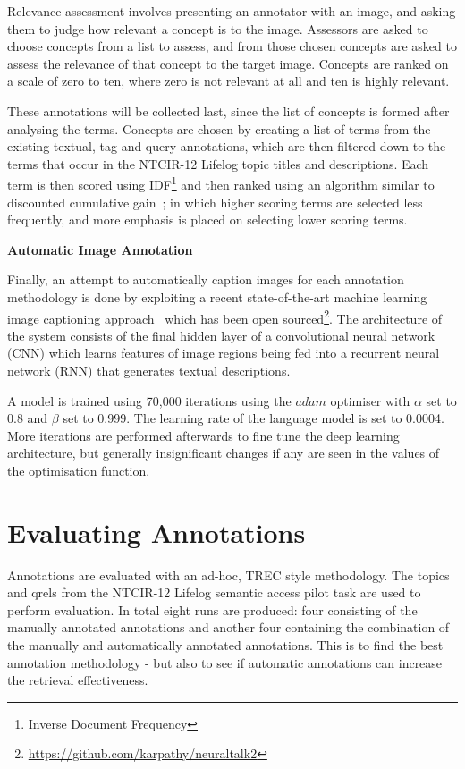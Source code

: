 Relevance assessment involves presenting an annotator with an image, and asking them to judge how relevant a concept is to the image. Assessors are asked to choose concepts from a list to assess, and from those chosen concepts are asked to assess the relevance of that concept to the target image. Concepts are ranked on a scale of zero to ten, where zero is not relevant at all and ten is highly relevant.

These annotations will be collected last, since the list of concepts is formed after analysing the terms. Concepts are chosen by creating a list of terms from the existing textual, tag and query annotations, which are then filtered down to the terms that occur in the NTCIR-12 Lifelog topic titles and descriptions. Each term is then scored using IDF\footnote{Inverse Document Frequency} and then ranked using an algorithm similar to discounted cumulative gain~\cite{jarvelin2002cumulated}; in which higher scoring terms are selected less frequently, and more emphasis is placed on selecting lower scoring terms. 

\newpage
\textbf{Automatic Image Annotation}

Finally, an attempt to automatically caption images for each annotation methodology is done by exploiting a recent state-of-the-art machine learning image captioning approach~\cite{karpathy2015deep} which has been open sourced\footnote{\url{https://github.com/karpathy/neuraltalk2}}. The architecture of the system consists of the final hidden layer of a convolutional neural network (CNN) which learns features of image regions being fed into a recurrent neural network (RNN) that generates textual descriptions.

A model is trained using 70,000 iterations using the $adam$ optimiser with $\alpha$ set to 0.8 and $\beta$ set to 0.999. The learning rate of the language model is set to 0.0004. More iterations are performed afterwards to fine tune the deep learning architecture, but generally insignificant changes if any are seen in the values of the optimisation function.

\section{Evaluating Annotations}

Annotations are evaluated with an ad-hoc, TREC style methodology. The topics and qrels from the NTCIR-12 Lifelog semantic access pilot task are used to perform evaluation. In total eight runs are produced: four consisting of the manually annotated annotations and another four containing the combination of the manually and automatically annotated annotations. This is to find the best annotation methodology - but also to see if automatic annotations can increase the retrieval effectiveness.


